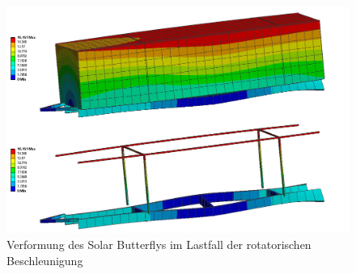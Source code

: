 
\begin{figure}[H]
  \centering
  \includegraphics[width=1\linewidth]{04_figures/FEM 1.5.png}
  \caption{Verformung des Solar Butterflys im Lastfall der rotatorischen Beschleunigung}
  \label{FEM 1.5}
\end{figure}


\newpage
